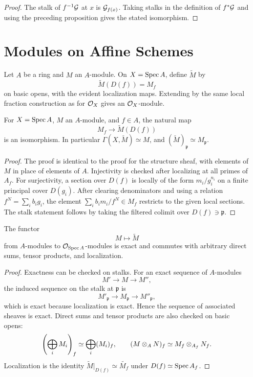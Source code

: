 \begin{proof}
The stalk of \(f^{-1}\mathcal{G}\) at \(x\) is \(\mathcal{G}_{f(x)}\).  Taking stalks in the
definition of \(f^*\mathcal{G}\) and using the preceding proposition gives the stated
isomorphism.
\end{proof}

\section{Modules on Affine Schemes}

\begin{definition}
Let \(A\) be a ring and \(M\) an \(A\)-module.  On \(X=\operatorname{Spec} A\), define
\(\widetilde{M}\) by
\[
    \widetilde{M}(D(f))=M_f
\]
on basic opens, with the evident localization maps.  Extending by the same
local fraction construction as for \(\mathcal{O}_X\) gives an \(\mathcal{O}_X\)-module.
\end{definition}

\begin{proposition}
For \(X=\operatorname{Spec} A\), \(M\) an \(A\)-module, and \(f\in A\), the natural map
\[
    M_f\longrightarrow \widetilde{M}(D(f))
\]
is an isomorphism.  In particular \(\Gamma(X,\widetilde{M})\simeq M\), and
\((\widetilde M)_{\mathfrak p}\simeq M_{\mathfrak p}\).
\end{proposition}

\begin{proof}
The proof is identical to the proof for the structure sheaf, with elements of
\(M\) in place of elements of \(A\).  Injectivity is checked after localizing at
all primes of \(A_f\).  For surjectivity, a section over \(D(f)\) is locally of
the form \(m_i/g_i^{n_i}\) on a finite principal cover \(D(g_i)\).  After
clearing denominators and using a relation \(f^N=\sum_i b_i g_i\), the element
\(\sum_i b_i m_i/f^N\in M_f\) restricts to the given local sections.  The stalk
statement follows by taking the filtered colimit over \(D(f)\ni\mathfrak p\).
\end{proof}

\begin{proposition}
The functor
\[
    M\longmapsto \widetilde M
\]
from \(A\)-modules to \(\mathcal{O}_{\operatorname{Spec} A}\)-modules is exact and commutes with
arbitrary direct sums, tensor products, and localization.
\end{proposition}

\begin{proof}
Exactness can be checked on stalks.  For an exact sequence of \(A\)-modules
\[
    M'\longrightarrow M\longrightarrow M'',
\]
the induced sequence on the stalk at \(\mathfrak p\) is
\[
    M'_{\mathfrak p}\longrightarrow M_{\mathfrak p}\longrightarrow
    M''_{\mathfrak p},
\]
which is exact because localization is exact.  Hence the sequence of associated
sheaves is exact.  Direct sums and tensor products are also checked on basic
opens:
\[
    \left(\bigoplus_i M_i\right)_f\simeq\bigoplus_i (M_i)_f,\qquad
    (M\otimes_A N)_f\simeq M_f\otimes_{A_f}N_f.
\]
Localization is the identity
\(\widetilde M|_{D(f)}\simeq \widetilde{M_f}\) under
\(D(f)\simeq\operatorname{Spec} A_f\).
\end{proof}

